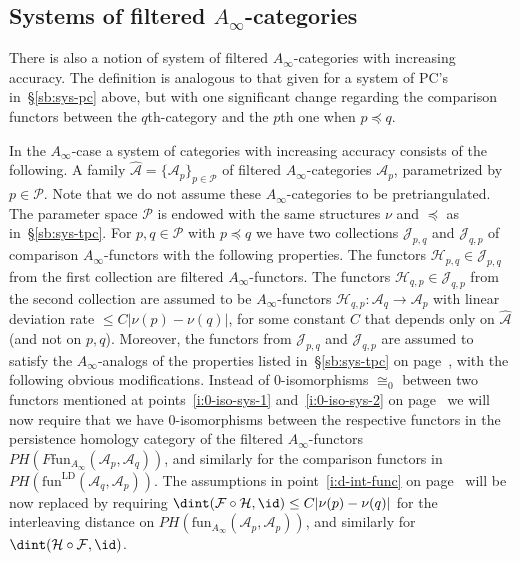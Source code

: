 \subsection{Systems of filtered
  $A_{\infty}$-categories} \label{sb:sys-ainfty} There is also a
notion of system of filtered $A_{\infty}$-categories with increasing
accuracy. The definition is analogous to that given for a system of
PC's in~\S\ref{sb:sys-pc} above, but with one significant change
regarding the comparison functors between the $q$th-category and the
$p$th one when $p \preceq q$.

In the $A_{\infty}$-case a system of categories with increasing
accuracy consists of the following. A family
$\widehat{\mathcal{A}} = \{\mathcal{A}_p\}_{p \in \mathcal{P}}$ of
filtered $A_{\infty}$-categories $\mathcal{A}_p$, parametrized by
$p \in \mathcal{P}$. Note that we do not assume these
$A_{\infty}$-categories to be pretriangulated. The parameter space
$\mathcal{P}$ is endowed with the same structures $\nu$ and $\preceq$
as in~\S\ref{sb:sys-tpc}. For $p, q \in \mathcal{P}$ with
$p \preceq q$ we have two collections $\mathcal{J}_{p,q}$ and
$\mathcal{J}_{q,p}$ of comparison $A_{\infty}$-functors with the
following properties. The functors
$\mathcal{H}_{p,q} \in \mathcal{J}_{p,q}$ from the first collection
are filtered $A_{\infty}$-functors. The functors
$\mathcal{H}_{q,p} \in \mathcal{J}_{q,p}$ from the second collection
are assumed to be $A_{\infty}$-functors
$\mathcal{H}_{q,p}: \mathcal{A}_q \longrightarrow \mathcal{A}_p$ with
linear deviation rate $\leq C | \nu(p) - \nu(q)|$, for some constant
$C$ that depends only on $\widehat{\mathcal{A}}$ (and not on $p,
q$). Moreover, the functors from $\mathcal{J}_{p,q}$ and
$\mathcal{J}_{q,p}$ are assumed to satisfy the $A_{\infty}$-analogs of
the properties listed in~\S\ref{sb:sys-tpc} on
page~\pageref{pp:sys-functors}, with the following obvious
modifications. Instead of $0$-isomorphisms $\cong_0$ between two
functors mentioned at points~\eqref{i:0-iso-sys-1}
and~\eqref{i:0-iso-sys-2} on page~\pageref{pp:sys-functors} we will
now require that we have $0$-isomorphisms between the respective functors in the persistence homology category of the
filtered $A_{\infty}$-functors
$PH (F\text{fun}_{A_{\infty}}(\mathcal{A}_p, \mathcal{A}_q))$, and
similarly for the comparison functors in
$PH(\text{fun}^{\text{LD}}(\mathcal{A}_q, \mathcal{A}_p))$. The
assumptions in point~\eqref{i:d-int-func} on
page~\pageref{pp:sys-functors} will be now replaced by requiring 
$\dint(\mathcal{F} \circ \mathcal{H}, \id) \leq C | \nu(p) - \nu(q)|$
for the interleaving distance on
$PH (\text{fun}_{A_{\infty}}(\mathcal{A}_p, \mathcal{A}_p))$, and
similarly for $\dint(\mathcal{H} \circ \mathcal{F}, \id)$.

